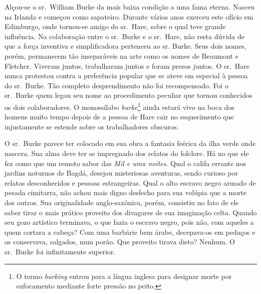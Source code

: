 Alçou-se o sr.~William Burke da mais baixa condição a uma fama eterna.
Nasceu na Irlanda e começou como sapateiro. Durante vários anos exerceu
este ofício em Edimburgo, onde tornou-se amigo do sr.~Hare, sobre o qual
teve grande influência. Na colaboração entre o sr.~Burke e o sr.~Hare, não
resta dúvida de que a força inventiva e simplificadora pertenceu ao sr.
Burke. Seus dois nomes, porém, permanecem tão inseparáveis na arte como os
nomes de Beaumont e Fletcher. Viveram juntos, trabalharam juntos e foram
presos juntos. O sr.~Hare nunca protestou contra a preferência popular que
se ateve em especial à pessoa do sr.~Burke. Tão completo desprendimento
não foi recompensado. Foi o sr.~Burke quem legou seu nome ao procedimento
peculiar que tornou conhecidos os dois colaboradores. O monossílabo
\textit{burke}\footnote{ O termo \textit{burking} entrou para a língua
inglesa para designar morte por sufocamento mediante forte pressão no peito.} 
ainda estará vivo na boca dos homens muito tempo depois de
a pessoa de Hare cair no esquecimento que injustamente se estende sobre os
trabalhadores obscuros.

O sr.~Burke parece ter colocado em sua obra a fantasia feérica da ilha
verde onde nascera. Sua alma deve ter se impregnado dos relatos do
folclore. Há no que ele fez como que um remoto sabor das \textit{Mil e uma
noites}. Qual o califa errante nos jardins noturnos de Bagdá, desejou
misteriosas aventuras, sendo curioso por relatos desconhecidos e pessoas
estrangeiras. Qual o alto escravo negro armado de pesada cimitarra, não
achou mais digno desfecho para sua volúpia que a morte dos outros. Sua
originalidade anglo-saxônica, porém, consistiu no fato de ele saber tirar
o mais prático proveito dos divagares de sua imaginação celta. Quando seu
gozo artístico terminava, o que fazia o escravo negro, pois não, com
aqueles a quem cortara a cabeça? Com uma barbárie bem árabe, decepava-os
em pedaços e os conservava, salgados, num porão. Que proveito tirava
disto? Nenhum. O sr.~Burke foi infinitamente superior.


